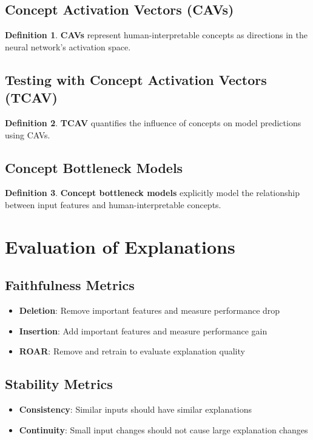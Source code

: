 \documentclass[11pt]{article}
\theoremstyle{definition}
\newtheorem{definition}{Definition}[section]
\begin{document}
\subsection{Concept Activation Vectors (CAVs)}
\begin{definition}
\textbf{CAVs} represent human-interpretable concepts as directions in the neural network's activation space.
\end{definition}

\subsection{Testing with Concept Activation Vectors (TCAV)}
\begin{definition}
\textbf{TCAV} quantifies the influence of concepts on model predictions using CAVs.
\end{definition}

\subsection{Concept Bottleneck Models}
\begin{definition}
\textbf{Concept bottleneck models} explicitly model the relationship between input features and human-interpretable concepts.
\end{definition}

\section{Evaluation of Explanations}

\subsection{Faithfulness Metrics}
\begin{itemize}
    \item \textbf{Deletion}: Remove important features and measure performance drop
    \item \textbf{Insertion}: Add important features and measure performance gain
    \item \textbf{ROAR}: Remove and retrain to evaluate explanation quality
\end{itemize}

\subsection{Stability Metrics}
\begin{itemize}
    \item \textbf{Consistency}: Similar inputs should have similar explanations
    \item \textbf{Continuity}: Small input changes should not cause large explanation changes
\end{itemize}
\end{document}
